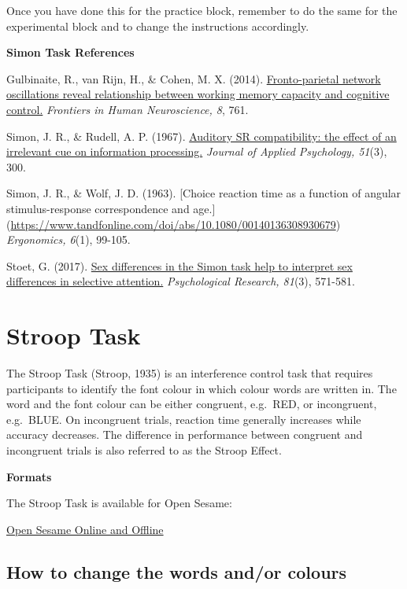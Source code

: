 \documentclass[
]{book}
\begin{document}
Once you have done this for the practice block, remember to do the same for the experimental block and to change the instructions accordingly.

\textbf{Simon Task References}

Gulbinaite, R., van Rijn, H., \& Cohen, M. X. (2014). \href{https://www.frontiersin.org/articles/10.3389/fnhum.2014.00761/full}{Fronto-parietal network oscillations reveal relationship between working memory capacity and cognitive control.} \emph{Frontiers in Human Neuroscience, 8}, 761.

Simon, J. R., \& Rudell, A. P. (1967). \href{https://suprimo.lib.strath.ac.uk/permalink/f/1jihtat/TN_cdi_proquest_journals_614414775}{Auditory SR compatibility: the effect of an irrelevant cue on information processing.} \emph{Journal of Applied Psychology, 51}(3), 300.

Simon, J. R., \& Wolf, J. D. (1963). {[}Choice reaction time as a function of angular stimulus-response correspondence and age.{]} (\url{https://www.tandfonline.com/doi/abs/10.1080/00140136308930679}) \emph{Ergonomics, 6}(1), 99-105.

Stoet, G. (2017). \href{https://link.springer.com/content/pdf/10.1007/s00426-016-0763-4.pdf}{Sex differences in the Simon task help to interpret sex differences in selective attention.} \emph{Psychological Research, 81}(3), 571-581.

\hypertarget{stroop-task}{%
\section{Stroop Task}\label{stroop-task}}

The Stroop Task (Stroop, 1935) is an interference control task that requires participants to identify the font colour in which colour words are written in. The word and the font colour can be either congruent, e.g.~{RED}, or incongruent, e.g.~{BLUE}. On incongruent trials, reaction time generally increases while accuracy decreases. The difference in performance between congruent and incongruent trials is also referred to as the Stroop Effect.

\textbf{Formats}

The Stroop Task is available for Open Sesame:

\href{link\%20here}{Open Sesame Online and Offline}

\hypertarget{how-to-change-the-words-andor-colours}{%
\subsection{How to change the words and/or colours}\label{how-to-change-the-words-andor-colours}}
\end{document}

